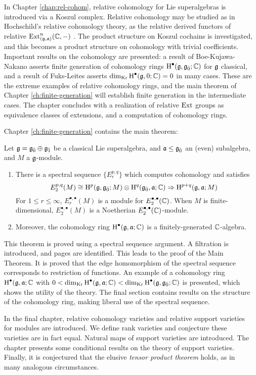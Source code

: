 In Chapter \ref{chap:rel-cohom}, relative cohomology for Lie superalgebras is introduced via a Koszul complex. Relative cohomology may be studied as in Hochschild's relative cohomology theory, as the relative derived functors of relative $\operatorname{Ext}_{(\mathfrak{g},\mathfrak{a})}^n(\mathbb{C},-)$ \cite{hochschild}. The product structure on Koszul cochains is investigated, and this becomes a product structure on cohomology with trivial coefficients. Important results on the cohomology are presented: a result of Boe-Kujawa-Nakano \cite{BKN-1} asserts finite generation of cohomology rings $\operatorname{H}^\bullet(\mathfrak{g},{\mathfrak{g}}_{\bar{0}};\mathbb{C})$ for $\mathfrak{g}$ classical, and a result of Fuks-Leites asserts $\dim_{\operatorname{Kr}} \operatorname{H}^\bullet(\mathfrak{g},0;\mathbb{C}) = 0$ in many cases. These are the extreme examples of relative cohomology rings, and the main theorem of Chapter \ref{ch:finite-generation} will establish finite generation in the intermediate cases. The chapter concludes with a realization of relative $\operatorname{Ext}$ groups as equivalence classes of extensions, and a computation of cohomology rings.

Chapter \ref{ch:finite-generation} contains the main theorem:
\begin{maintheorem}
  Let $\mathfrak{g} = {\mathfrak{g}}_{\bar{0}} \oplus {\mathfrak{g}}_{\bar{1}}$ be a classical Lie superalgebra, and $\mathfrak{a} \leq {\mathfrak{g}}_{\bar{0}}$ an (even) subalgebra, and $M$ a $\mathfrak{g}$-module.
  \begin{enumerate}[\indent\rm (a)]
    \item There is a spectral sequence $\{E_r^{p,q}\}$ which computes cohomology and satisfies
  \[
    E_2^{p,q}(M) \cong \operatorname{H}^p(\mathfrak{g},{\mathfrak{g}}_{\bar{0}};M) \otimes \operatorname{H}^q({\mathfrak{g}}_{\bar{0}},\mathfrak{a};\mathbb{C}) \Rightarrow \operatorname{H}^{p+q}(\mathfrak{g},\mathfrak{a};M)
  \]
  For $1 \leq r \leq \infty$, $E_r^{\bullet,\bullet}(M)$ is a module for $E_2^{\bullet,\bullet}(\mathbb{C})$. When $M$ is finite-dimensional, $E_2^{\bullet,\bullet}(M)$ is a Noetherian $E_2^{\bullet,\bullet}(\mathbb{C})$-module.
    \item Moreover, the cohomology ring $\operatorname{H}^\bullet(\mathfrak{g},\mathfrak{a};\mathbb{C})$ is a finitely-generated $\mathbb{C}$-algebra.
  \end{enumerate}
\end{maintheorem}
This theorem is proved using a spectral sequence argument. A filtration is introduced, and pages are identified. This leads to the proof of the Main Theorem. It is proved that the edge homomorphism of the spectral sequence corresponds to restriction of functions. An example of a cohomology ring $\operatorname{H}^\bullet(\mathfrak{g},\mathfrak{a};\mathbb{C}$ with $0 < \dim_{\operatorname{Kr}} \operatorname{H}^\bullet(\mathfrak{g},\mathfrak{a};\mathbb{C}) < \dim_{\operatorname{Kr}} \operatorname{H}^\bullet(\mathfrak{g},{\mathfrak{g}}_{\bar{0}};\mathbb{C})$ is presented, which shows the utility of the theory. The final section contains results on the structure of the cohomology ring, making liberal use of the spectral sequence.

In the final chapter, relative cohomology varieties and relative support varieties for modules are introduced. We define rank varieties and conjecture these varieties are in fact equal. Natural maps of support varieties are introduced. The chapter presents some conditional results on the theory of support varieties. Finally, it is conjectured that the elusive \emph{tensor product theorem} holds, as in many analogous circumstances.



